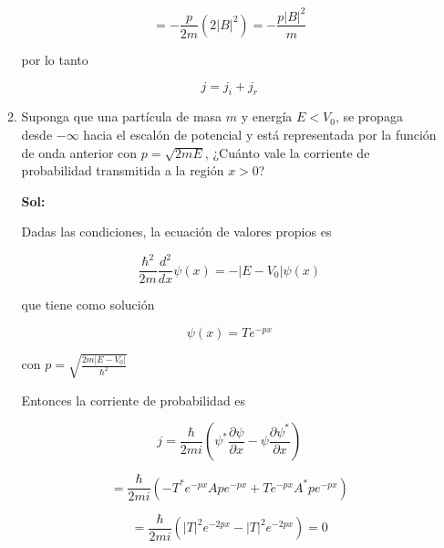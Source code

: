 \documentclass[12pt,a4paper]{article}
\begin{document}
\begin{enumerate}
\begin{enumerate}
        \begin{equation*}
            = -\frac{p}{2m} \left(2 |B|^2  \right) = -\frac{p|B|^2}{m}
        \end{equation*}
        
        por lo tanto
        
        \begin{equation*}
            j  = j_i + j_r
        \end{equation*}
        
        
        \item Suponga que una partícula de masa $m$ y energía $E < V_0$, se propaga desde $-\infty$ hacia el escalón de potencial y está representada por la función de onda anterior con $p =\sqrt{2mE}$, ¿Cuánto vale la corriente de probabilidad transmitida a la región $x>0$?
        
        \textbf{Sol:}
        
        Dadas las condiciones, la ecuación de valores propios es
        
        \begin{equation*}
            \frac{\hbar^2}{2m} \frac{d^2}{dx} \psi (x) = -|E -V_0| \psi (x)
        \end{equation*}
        
        que tiene como solución
        
        \begin{equation*}
            \psi (x) = T e^{-px}
        \end{equation*}
        
        con $p = \sqrt{\frac{2m |E-V_0|}{\hbar^2}}$
        
        Entonces la corriente de probabilidad es
        
        \begin{equation*}
            j = \frac{\hbar}{2mi}\left(\psi^* \frac{\partial \psi}{\partial x} - \psi \frac{\partial \psi^*}{\partial x}\right)
        \end{equation*}
        
        \begin{equation*}
            = \frac{\hbar}{2mi}\left(-T^* e^{-px} A p e^{-px} + T e^{-px} A^* p e^{-px}\right)
        \end{equation*}
        
        \begin{equation*}
            = \frac{\hbar}{2mi}\left(|T|^2 e^{-2px} - |T|^2 e^{-2px}\right) = 0
        \end{equation*}
        


\end{enumerate}
\end{enumerate}
\end{document}
